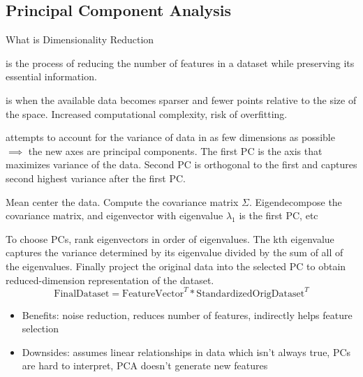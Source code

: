 \documentclass[12pt]{scrartcl}
\begin{document}
\subsection{Principal Component Analysis}

What is Dimensionality Reduction

\begin{definition}
   is the process of reducing the number of 
  features in a dataset while preserving its essential information.
\end{definition}

\begin{definition}
   is when the available data becomes sparser and fewer points relative to the size of the 
  space. Increased computational complexity, risk of overfitting. 
\end{definition}

\begin{definition}
   attempts to account for the variance of data in as few dimensions as possible $\implies$ 
  the new axes are principal components. The first PC is the axis that maximizes variance of the 
  data. Second PC is orthogonal to the first and captures second highest variance after the first PC.
\end{definition}

\begin{note}
  Mean center the data. Compute the covariance matrix $\Sigma$. Eigendecompose the covariance matrix, and 
  eigenvector with eigenvalue $\lambda_1$ is the first PC, etc
\end{note}

\begin{note}
  To choose PCs, rank eigenvectors in order of eigenvalues. The kth eigenvalue captures the variance determined by its 
  eigenvalue divided by the sum of all of the eigenvalues. Finally project the original data 
  into the selected PC to obtain reduced-dimension representation of the dataset.
  \[\text{FinalDataset} = \text{FeatureVector}^T * \text{StandardizedOrigDataset}^T\]
\end{note}

\begin{note}

  \hfill
  
  \begin{itemize}
    \item Benefits: noise reduction, reduces number of features, indirectly helps feature selection
    \item Downsides: assumes linear relationships in data which isn't always true, PCs are hard to interpret, PCA doesn't generate new features
  \end{itemize}
\end{note}
\end{document}
